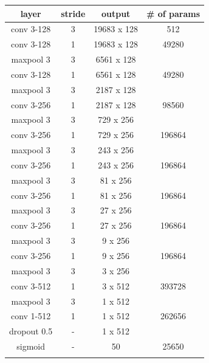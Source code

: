\begin{center}
	\begin{tabular}{ c c c c}
		
		layer & stride & output & \# of params\\
		\hline
		\hline
		conv 3-128 & 3 & 19683 x 128 & 512 \\
		\hline
		conv 3-128 & 1 & 19683 x 128 & 49280 \\
		maxpool 3 & 3 & 6561 x 128 & \\
		\hline
		conv 3-128 & 1 & 6561 x 128 & 49280 \\
		maxpool 3 & 3 & 2187 x 128 & \\
		\hline
		conv 3-256 & 1 & 2187 x 128 & 98560 \\
		maxpool 3 & 3 & 729 x 256 & \\
		\hline
		conv 3-256 & 1 & 729 x 256 & 196864 \\
		maxpool 3 & 3 & 243 x 256 & \\
		\hline
		conv 3-256 & 1 & 243 x 256 & 196864 \\
		maxpool 3 & 3 & 81 x 256 & \\
		\hline
		conv 3-256 & 1 & 81 x 256 & 196864 \\
		maxpool 3 & 3 & 27 x 256 & \\
		\hline
		conv 3-256 & 1 & 27 x 256 & 196864 \\
		maxpool 3 & 3 & 9 x 256 & \\
		\hline
		conv 3-256 & 1 & 9 x 256 & 196864 \\
		maxpool 3 & 3 & 3 x 256 & \\
		\hline
		conv 3-512 & 1 & 3 x 512 & 393728 \\
		maxpool 3 & 3 & 1 x 512 & \\
		\hline
		conv 1-512 & 1 & 1 x 512 & 262656 \\
		dropout 0.5 & - & 1 x 512 & \\
		\hline
		sigmoid & - & 50 & 25650 \\
		
		& & & \\	
	\end{tabular}
	\label{tab:sample-dcnn_original-model}
\end{center}


